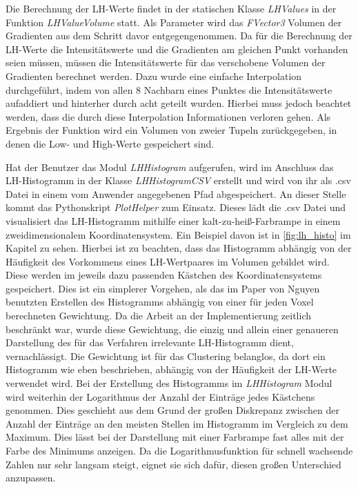 Die Berechnung der LH-Werte findet in der statischen Klasse \textit{LHValues} in der Funktion \textit{LHValueVolume} statt. Als Parameter wird das \textit{FVector3} Volumen der Gradienten aus dem Schritt davor entgegengenommen.
Da für die Berechnung der LH-Werte die Intensitätswerte und die Gradienten am gleichen Punkt vorhanden seien müssen, müssen die Intensitätswerte für das verschobene Volumen der Gradienten berechnet werden. Dazu wurde eine einfache Interpolation durchgeführt, indem von allen 8 Nachbarn eines Punktes die Intensitätswerte aufaddiert und hinterher durch acht geteilt wurden. Hierbei muss jedoch beachtet werden, dass die durch diese Interpolation Informationen verloren gehen.
\newline
Als Ergebnis der Funktion wird ein Volumen von zweier Tupeln zurückgegeben, in denen die Low- und High-Werte gespeichert sind.


Hat der Benutzer das Modul \textit{LHHistogram} aufgerufen, wird im Anschluss das LH-Histogramm in der Klasse \textit{LHHistogramCSV} erstellt und wird von ihr als .csv Datei in einem vom Anwender angegebenen Pfad abgespeichert.
An dieser Stelle kommt das Pythonskript \textit{PlotHelper} zum Einsatz. Dieses lädt die .csv Datei und visualisiert das LH-Histogramm mithilfe einer kalt-zu-heiß-Farbrampe in einem zweidimensionalem Koordinatensystem.
Ein Beispiel davon ist in \autoref{fig:lh_histo} im Kapitel  zu sehen. Hierbei ist zu beachten, dass das Histogramm abhängig von der Häufigkeit des Vorkommens eines LH-Wertpaares im Volumen gebildet wird. Diese werden im jeweils dazu passenden Kästchen des Koordinatensystems gespeichert. Dies ist ein simplerer Vorgehen, als das im Paper von Nguyen \cite{nguyen2012clustering} benutzten Erstellen des Histogramms abhängig von einer für jeden Voxel berechneten Gewichtung.
\newline
Da die Arbeit an der Implementierung zeitlich beschränkt war, wurde diese Gewichtung, die einzig und allein einer genaueren Darstellung des für das Verfahren irrelevante LH-Histogramm dient, vernachlässigt. Die Gewichtung ist für das Clustering belanglos, da dort ein Histogramm wie eben beschrieben, abhängig von der Häufigkeit der LH-Werte verwendet wird.
Bei der Erstellung des Histogramms im \textit{LHHistogram} Modul wird weiterhin der Logarithmus der Anzahl der Einträge jedes Kästchens genommen. Dies geschieht aus dem Grund der großen Diskrepanz zwischen der Anzahl der Einträge an den meisten Stellen im Histogramm im Vergleich zu dem Maximum. Dies lässt bei der Darstellung mit einer Farbrampe fast alles mit der Farbe des Minimums anzeigen. Da die Logarithmusfunktion für schnell wachsende Zahlen nur sehr langsam steigt, eignet sie sich dafür, diesen großen Unterschied anzupassen.


